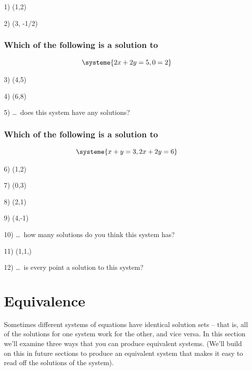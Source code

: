 \documentclass[a4paper,twoside,12pt]{memoir}  %
\begin{document}
\begin{list}{}
\item 1) (1,2)
\item 2) (3, -1/2)
\end{list}

\subsubsection{Which of the following is a solution to}
\begin{equation*}
  \systeme{
    2x + 2y = 5,
          0 = 2
  }
\end{equation*}

\begin{list}{}
\item 3) (4,5)
\item 4) (6,8)
\item 5) \ldots\ does this system have any solutions?
\end{list}

\subsubsection{Which of the following is a solution to}
\begin{equation*}
  \systeme{
    x +  y = 3,
    2x + 2y = 6
  }
\end{equation*}

\begin{list}{}
\item 6) (1,2)
\item 7) (0,3)
\item 8) (2,1)
\item 9) (4,-1)
\item 10) \ldots\ how many solutions do you think this system has?
\item 11) (1,1,)
\item 12) \ldots\ is every point a solution to this system?
\end{list}

\section{Equivalence}
Sometimes different systems of equations have identical solution sets -- that is, all of the solutions for one system work for the other, and vice versa. In this section we'll examine three ways that you can produce equivalent systems. (We'll build on this in future sections to produce an equivalent system that makes it easy to read off the solutions of the system).
\end{document}
